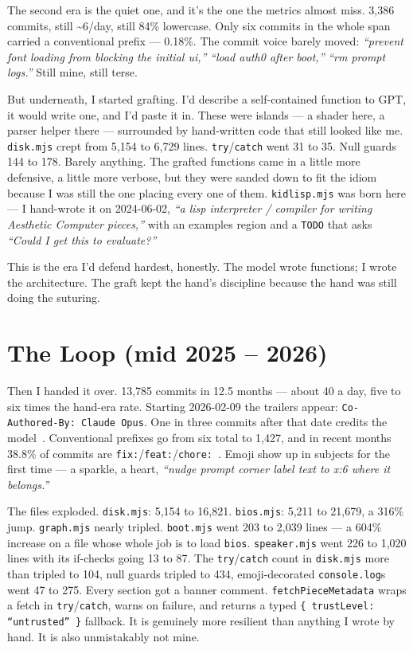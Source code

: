 \documentclass[10pt,letterpaper,twocolumn]{article}
\begin{document}
The second era is the quiet one, and it's the one the metrics almost miss. 3,386 commits, still \textasciitilde6/day, still 84\% lowercase. Only six commits in the whole span carried a conventional prefix --- 0.18\%. The commit voice barely moved: \emph{``prevent font loading from blocking the initial ui,''} \emph{``load auth0 after boot,''} \emph{``rm prompt logs.''} Still mine, still terse.

But underneath, I started grafting. I'd describe a self-contained function to GPT, it would write one, and I'd paste it in. These were islands --- a shader here, a parser helper there --- surrounded by hand-written code that still looked like me. \texttt{disk.mjs} crept from 5,154 to 6,729 lines. \texttt{try}/\texttt{catch} went 31 to 35. Null guards 144 to 178. Barely anything. The grafted functions came in a little more defensive, a little more verbose, but they were sanded down to fit the idiom because I was still the one placing every one of them. \texttt{kidlisp.mjs} was born here --- I hand-wrote it on 2024-06-02, \emph{``a lisp interpreter / compiler for writing Aesthetic Computer pieces,''} with an examples region and a \texttt{TODO} that asks \emph{``Could I get this to evaluate?''}

This is the era I'd defend hardest, honestly. The model wrote functions; I wrote the architecture. The graft kept the hand's discipline because the hand was still doing the suturing.


\section{The Loop (mid 2025 -- 2026)}

Then I handed it over. 13,785 commits in 12.5 months --- about 40 a day, five to six times the hand-era rate. Starting 2026-02-09 the trailers appear: \texttt{Co-Authored-By: Claude Opus}. One in three commits after that date credits the model~\citep{anthropic2026claudecode}. Conventional prefixes go from six total to 1,427, and in recent months 38.8\% of commits are \texttt{fix:}/\texttt{feat:}/\texttt{chore:}~\citep{conventionalcommits}. Emoji show up in subjects for the first time --- a sparkle, a heart, \emph{``nudge prompt corner label text to x:6 where it belongs.''}

The files exploded. \texttt{disk.mjs}: 5,154 to 16,821. \texttt{bios.mjs}: 5,211 to 21,679, a 316\% jump. \texttt{graph.mjs} nearly tripled. \texttt{boot.mjs} went 203 to 2,039 lines --- a 604\% increase on a file whose whole job is to load \texttt{bios}. \texttt{speaker.mjs} went 226 to 1,020 lines with its if-checks going 13 to 87. The \texttt{try}/\texttt{catch} count in \texttt{disk.mjs} more than tripled to 104, null guards tripled to 434, emoji-decorated \texttt{console.log}s went 47 to 275. Every section got a banner comment. \texttt{fetchPieceMetadata} wraps a fetch in \texttt{try}/\texttt{catch}, warns on failure, and returns a typed \texttt{\{ trustLevel: ``untrusted'' \}} fallback. It is genuinely more resilient than anything I wrote by hand. It is also unmistakably not mine.
\end{document}
